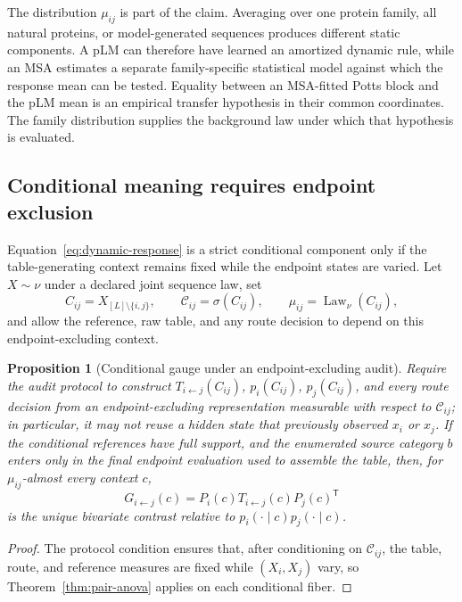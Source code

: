 \documentclass[10pt]{article}
\newtheorem{proposition}[theorem]{Proposition}
\theoremstyle{definition}
\theoremstyle{remark}
\newcommand{\BookInsert}[1]{}
\newcommand{\BookSection}[1]{\subsection{#1}}
\begin{document}
The distribution $\mu_{ij}$ is part of the claim.  Averaging over one protein family, all natural
proteins, or model-generated sequences produces different static components.  A pLM can therefore
have learned an amortized dynamic rule, while an MSA estimates a separate family-specific
statistical model against which the response mean can be tested.  Equality between an MSA-fitted
Potts block and the pLM mean is an empirical transfer hypothesis in their common coordinates.  The
family distribution supplies the background law under which that hypothesis is evaluated.

\BookInsert{chapters/04_sompolinsky_dynamic_response}

\BookSection{Conditional meaning requires endpoint exclusion}

Equation~\ref{eq:dynamic-response} is a strict conditional component only if the table-generating
context remains fixed while the endpoint states are varied.  Let
$X\sim\nu$ under a declared joint sequence law, set
\begin{equation}
C_{ij}=X_{[L]\setminus\{i,j\}},
\qquad
\mathcal C_{ij}=\sigma(C_{ij}),
\qquad
\mu_{ij}=\operatorname{Law}_{\nu}(C_{ij}),
\label{eq:endpoint-excluding-context-law}
\end{equation}
and allow the reference, raw table, and any route decision to depend on this endpoint-excluding context.

\begin{proposition}[Conditional gauge under an endpoint-excluding audit]
\label{prop:conditional-gauge}
Require the audit protocol to construct $T_{i\leftarrow j}(C_{ij})$, $p_i(C_{ij})$,
$p_j(C_{ij})$, and every route
decision from an endpoint-excluding representation measurable with respect to $\mathcal C_{ij}$;
in particular, it may not reuse a hidden state that previously observed $x_i$ or $x_j$.  If the
conditional references have full support, and the enumerated source category $b$ enters only in the
final endpoint evaluation used to assemble the table, then, for $\mu_{ij}$-almost every context $c$,
\begin{equation}
G_{i\leftarrow j}(c)
=P_i(c)T_{i\leftarrow j}(c)P_j(c)^{\mathsf T}
\end{equation}
is the unique bivariate contrast relative to
$p_i(\cdot\mid c)p_j(\cdot\mid c)$.
\end{proposition}

\begin{proof}
The protocol condition ensures that, after conditioning on $\mathcal C_{ij}$, the table, route,
and reference measures are fixed while
$(X_i,X_j)$ vary, so Theorem~\ref{thm:pair-anova} applies on each conditional fiber.
\end{proof}
\end{document}
